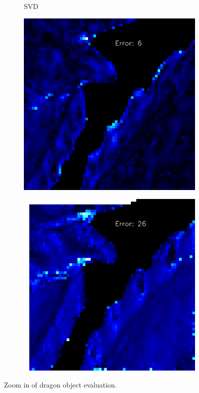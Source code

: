 \documentclass[border=15pt, multi, tikz]{article}
\begin{document}
\begin{figure}[th]
\begin{subfigure}[b]{0.15\linewidth}
		\caption{SVD}
	\end{subfigure}
	\begin{subfigure}[b]{0.15\linewidth}
		\includegraphics[width=\linewidth]{./Figures/comparison/eval_2_error_GCNN.png}
		\caption{}
	\end{subfigure}
	\begin{subfigure}[b]{0.15\linewidth}
		\includegraphics[width=\linewidth]{./Figures/comparison/eval_2_error_SVD.png}
		\caption{}
	\end{subfigure}
	\caption{Zoom in of dragon object evaluation.}
	\label{fig:gcnn-eval-synthetic-zoom-in}
\end{figure}
\end{document}

